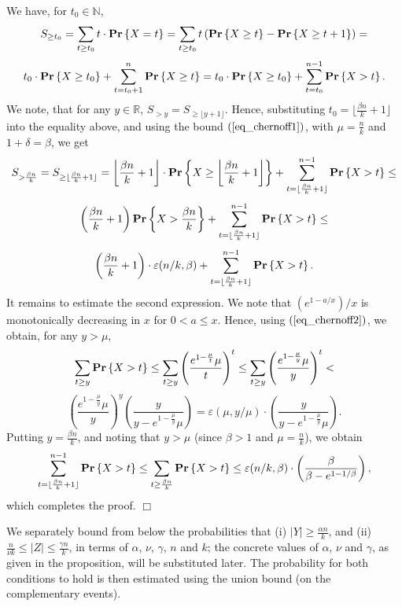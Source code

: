 \documentclass[11pt]{article}
\def\reals{\mathbb R}
\def\eps{\varepsilon}
\begin{document}
 We have, for $t_{0} \in \mathbb N$,
$$
S_{\geq t_{0}} = \sum_{t \geq t_{0}} t \cdot {\bf Pr}\left\{X = t \right\} =
\sum_{t \geq t_{0}} t \left({\bf Pr} \left\{X \geq t \right\} - {\bf Pr}\left\{X \geq t + 1 \right\} \right) =
$$
$$
t_{0} \cdot {\bf Pr}\left\{X \geq t_{0}\right\} + \sum_{t = t_{0}+1}^{n} {\bf Pr}\left\{X \geq t\right\} = t_{0} \cdot {\bf Pr}\left\{X \geq t_{0} \right\} + \sum_{t = t_{0}}^{n-1} {\bf Pr}\left\{X > t\right\}.
$$
We note, that for any $y \in \reals$, $S_{> y} = S_{\geq \lfloor y+1 \rfloor}$. Hence, substituting $t_{0} = \lfloor \frac{\beta n}{k} + 1 \rfloor$ into the equality above, and  using the bound $(\ref{eq_chernoff1})$, with $\mu = \frac{n}{k}$ and $1 + \delta = \beta$, we get
$$
S_{> \frac{\beta n}{k}} = S_{\geq \lfloor \frac{\beta n}{k}+1 \rfloor} =
\left\lfloor \frac{\beta n}{k}+1 \right\rfloor \cdot {\bf Pr}\left\{X \geq \left\lfloor \frac{\beta n}{k}+1 \right\rfloor \right\} + \sum_{t = \lfloor \frac{\beta n}{k}+1 \rfloor}^{n-1} {\bf Pr}\left\{X > t\right\} \leq
$$
$$
\left(\frac{\beta n}{k} + 1\right) {\bf Pr}\left\{X > \frac{\beta n}{k}\right\} + \sum_{t = \lfloor \frac{\beta n}{k} + 1 \rfloor}^{n-1}{\bf Pr}\left\{X > t \right\} \leq
$$
$$
\left(\frac{\beta n}{k} + 1\right)\cdot\eps(n/k, \beta) + \sum_{t = \lfloor \frac{\beta n}{k} + 1 \rfloor}^{n-1}{\bf Pr}\left\{X > t \right\}.
$$
It remains to estimate the second expression. We note that $(e^{1-a/x})/x$ is monotonically decreasing in $x$ for $0 < a \leq x$. Hence, using $(\ref{eq_chernoff2})$, we obtain, for any $y > \mu$,
$$
\sum_{t \geq y}{\bf Pr}\left\{X > t\right\} \leq \sum_{t \geq y}\left(\frac{e^{1-\frac{\mu}{t}} \mu}{t}\right)^{t} \leq \sum_{t \geq y}\left(\frac{e^{1-\frac{\mu}{y}}\mu}{y}\right)^{t} <
$$
$$
\left(\frac{e^{1-\frac{\mu}{y}}\mu}{y}\right)^{y}\left(\frac{y}{y - e^{1-\frac{\mu}{y}}\mu}\right) = \eps(\mu, y/\mu) \cdot \left(\frac{y}{y - e^{1-\frac{\mu}{y}}\mu}\right).
$$
Putting $y = \frac{\beta n}{k}$, and noting that $y > \mu$ (since $\beta > 1$ and $\mu = \frac{n}{k}$), we obtain
$$
\sum_{t = \lfloor \frac{\beta n}{k} + 1 \rfloor}^{n-1}{\bf Pr}\left\{X > t \right\} \leq \sum_{t \geq \frac{\beta n}{k}}{\bf Pr}\left\{X > t \right\} \leq \eps(n/k,\beta) \cdot \left(\frac{\beta}{\beta - e^{1-1/\beta}}\right),
$$
which completes the proof. $\Box$

We separately bound from below the probabilities that (i) $|Y| \geq \frac{\alpha n}{k}$, and (ii) $\frac{n}{\nu k} \leq |Z| \leq \frac{\gamma n}{k}$, in terms of $\alpha$, $\nu$, $\gamma$, $n$ and $k$; the concrete values of $\alpha$, $\nu$ and $\gamma$, as given in the proposition, will be substituted later. The probability for both conditions to hold is then estimated using the union bound (on the complementary events).
\end{document}

